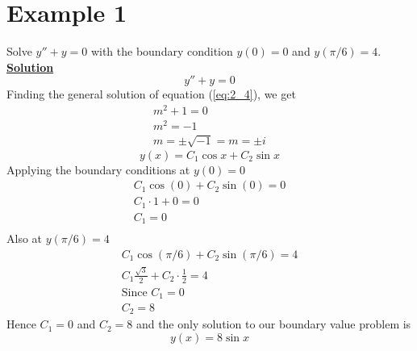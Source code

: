 \documentclass[12pt]{report}
\newcommand{\ubt}[1]{\textbf{\underline{#1}}}
\newcommand{\sps}{\\[0.2cm]}
\newcommand{\refn}[1]{(\ref{#1})}
\newcommand{\refx}[1]{\refn{eq:#1}}
\newcommand{\dsp}{\displaystyle}
\newcommand{\dprime}{''}
\begin{document}
	\section*{Example 1}
	Solve $\dsp y\dprime + y = 0$ with the boundary condition $y(0)=0$ and $y(\pi/6) = 4$.\sps
	\ubt{Solution}\sps
	\begin{equation}
		y\dprime + y = 0 \label{eq:2_4}
	\end{equation}
	Finding the general solution of equation \refx{2_4}, we get
	\begin{equation*}
		\begin{array}{c}
			m^2 + 1 = 0 \\
			m^2 = -1\\
			m = \pm\sqrt{-1} = m = \pm i
		\end{array}
	\end{equation*}
	\begin{equation}
		y(x) = C_1\cos x + C_2\sin x \label{eq:2_5}
	\end{equation}
	Applying the boundary conditions at $y(0) = 0$\sps
	\begin{equation*}
		\begin{array}{c}
			C_1\cos(0) + C_2\sin(0) = 0\sps
			C_1 \cdot 1 + 0 = 0 \sps
			C_1 = 0\sps
		\end{array}
	\end{equation*}
	Also at $y(\pi/6) = 4$\sps
	\begin{equation*}
		\begin{array}{c}
			C_1\cos(\pi/6) + C_2\sin(\pi/6) = 4\sps
			C_1\frac{\sqrt{3}}{2} + C_2 \cdot \frac{1}{2} = 4\sps
			\text{Since } C_1 = 0\sps
			C_2 = 8
		\end{array}
	\end{equation*}
	Hence $C_1 = 0$ and $C_2 = 8$ and the only solution to our boundary value problem is 
	\begin{equation*}
		y(x) = 8\sin x
	\end{equation*}
	
\end{document}
